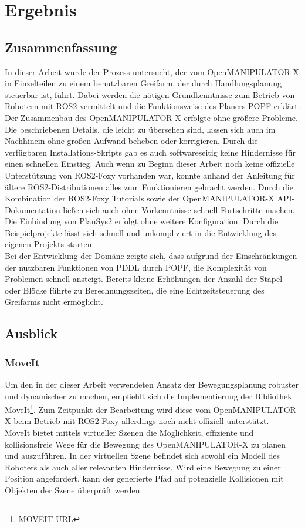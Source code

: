 \section{Ergebnis}
\subsection{Zusammenfassung}
In dieser Arbeit wurde der Prozess untersucht, der vom OpenMANIPULATOR-X in Einzelteilen zu einem benutzbaren Greifarm, der durch Handlungsplanung steuerbar ist, führt.
Dabei werden die nötigen Grundkenntnisse zum Betrieb von Robotern mit \ac{ROS2} vermittelt und die Funktionsweise des Planers \ac{POPF} erklärt.\\
Der Zusammenbau des OpenMANIPULATOR-X erfolgte ohne größere Probleme.
Die beschriebenen Details, die leicht zu übersehen sind, lassen sich auch im Nachhinein ohne großen Aufwand beheben oder korrigieren.
Durch die verfügbaren Installations-Skripts gab es auch softwareseitig keine Hindernisse für einen schnellen Einstieg.
Auch wenn zu Beginn dieser Arbeit noch keine offizielle Unterstützung von \ac{ROS2}-Foxy vorhanden war, konnte anhand der Anleitung für ältere \ac{ROS2}-Distributionen alles zum Funktionieren gebracht werden.
Durch die Kombination der \ac{ROS2}-Foxy Tutorials sowie der OpenMANIPULATOR-X API-Dokumentation ließen sich auch ohne Vorkenntnisse schnell Fortschritte machen.\\
Die Einbindung von \ac{PlanSys2} erfolgt ohne weitere Konfiguration.
Durch die Beispielprojekte lässt sich schnell und unkompliziert in die Entwicklung des eigenen Projekts starten.\\
Bei der Entwicklung der Domäne zeigte sich, dass aufgrund der Einschränkungen der nutzbaren Funktionen von \ac{PDDL} durch \ac{POPF}, die Komplexität von Problemen schnell ansteigt.
Bereits kleine Erhöhungen der Anzahl der Stapel oder Blöcke führte zu Berechnungszeiten, die eine Echtzeitsteuerung des Greifarms nicht ermöglicht.
\subsection{Ausblick}
\subsubsection{MoveIt}
Um den in der dieser Arbeit verwendeten Ansatz der Bewegungsplanung robuster und dynamischer zu machen, empfiehlt sich die Implementierung der Bibliothek MoveIt\footnote{MOVEIT URL}.
Zum Zeitpunkt der Bearbeitung wird diese vom OpenMANIPULATOR-X beim Betrieb mit \ac{ROS2} Foxy allerdings noch nicht offiziell unterstützt.\\
MoveIt bietet mittels virtueller Szenen die Möglichkeit, effiziente und kollisionsfreie Wege für die Bewegung des OpenMANIPULATOR-X zu planen und auszuführen.
In der virtuellen Szene befindet sich sowohl ein Modell des Roboters als auch aller relevanten Hindernisse.
Wird eine Bewegung zu einer Position angefordert, kann der generierte Pfad auf potenzielle Kollisionen mit Objekten der Szene überprüft werden.
